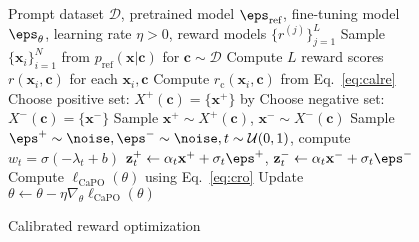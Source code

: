 \begin{figure}[t]
\begin{algorithm}[H]
\caption{Calibrated reward optimization}
\label{alg:dm}
\begin{algorithmic}[1]
\REQUIRE Prompt dataset $\mathcal{D}$, pretrained model $\eps_{\textrm{ref}}$, fine-tuning model $\eps_\theta$, learning rate $\eta>0$, reward models $\{r^{(j)}\}_{j=1}^L$
\STATE Sample $\{\mathbf{x}_i\}_{i=1}^N$ from $p_{\textrm{ref}}(\mathbf{x}|\mathbf{c})$ for $\mathbf{c}\sim\mathcal{D}$
\STATE Compute $L$ reward scores $r(\mathbf{x}_i, \mathbf{c})$ for each $\mathbf{x}_i, \mathbf{c}$
\STATE Compute $r_{\textrm{c}}(\mathbf{x}_i, \mathbf{c})$ from Eq.~\eqref{eq:calre}
\STATE Choose positive set: $X^+(\mathbf{c}) = \{\mathbf{x}^+\}$ by 
\STATE Choose negative set: $X^-(\mathbf{c}) = \{\mathbf{x}^-\}$
\STATE Sample $\mathbf{x}^+\sim X^+(\mathbf{c})$, $\mathbf{x}^-\sim X^-(\mathbf{c})$
\STATE Sample $\eps^+\sim\noise, \eps^-\sim\noise, t\sim\mathcal{U}(0,1)$, compute $w_t = \sigma(-\lambda_t + b)$
\STATE $\mathbf{z}_t^+ \leftarrow \alpha_t\mathbf{x}^+ + \sigma_t\eps^+$, $\mathbf{z}_t^- \leftarrow\alpha_t\mathbf{x}^- + \sigma_t\eps^-$
\STATE Compute $\ell_{\textrm{CaPO}}(\theta)$ using Eq.~\eqref{eq:cro}
\STATE Update $\theta \leftarrow \theta - \eta \nabla_\theta \ell_{\textrm{CaPO}}(\theta)$
\ENDWHILE
\end{algorithmic}
\end{algorithm}
\vspace{-15pt}
\end{figure}